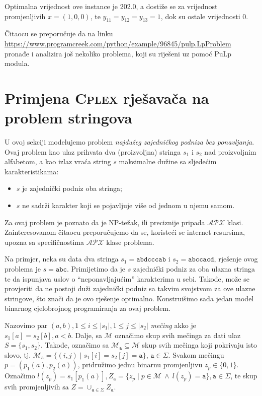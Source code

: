 \documentclass[a4paper, utf8, 11pt, colorlinks]{book}
\theoremstyle{definition}
\begin{document}
 Optimalna vrijednost ove instance je 202.0, a dostiže se za vrijednost promjenljivih $x = (1, 0, 0)$, te $y_{11}= y_{12}= y_{13} = 1$, dok su ostale vrijednosti 0.
 
Čitaocu se preporučuje da na linku \url{https://www.programcreek.com/python/example/96845/pulp.LpProblem}
pronađe i analizira još nekoliko problema, koji su riješeni uz pomoć PuLp modula. 
 
 \section{Primjena \textsc{Cplex} rješavača na problem stringova}
 
 U ovoj sekciji modelujemo problem \emph{najdužeg zajedničkog podniza bez ponavljanja}. Ovaj problem kao ulaz prihvata dva (proizvoljna) stringa $s_1$ i $s_2$ nad proizvoljnim alfabetom, a kao izlaz vraća string $s$ maksimalne dužine sa sljedećim karakteristikama:  
 \begin{itemize}
 	\item $s$ je zajednički podniz oba stringa; 
 	\item $s$ ne sadrži karakter koji se pojavljuje više od jednom u njemu samom.
 \end{itemize}
Za ovaj problem je poznato da je NP-težak, ili preciznije pripada $\mathcal{APX}$ klasi. Zainteresovanom čitaocu preporučujemo da se, koristeći se internet resursima, upozna sa specifičnostima $\mathcal{APX}$ klase problema.

Na primjer, neka su data dva stringa $s_1 = \texttt{abdcccab}$ i $s_2=\texttt{abccacd}$, rješenje ovog problema je $s=\texttt{abc}$. Primijetimo da je $s$ zajednički podniz za oba ulazna stringa te da ispunjava uslov o ``neponavljajućim'' karakterima u sebi. Takođe, može se provjeriti da ne postoji duži zajednički podniz sa takvim svojstvom za ove ulazne stringove, što znači da je ovo rješenje optimalno. Konstruišimo sada jedan model binarnog cjelobrojnog programiranja za ovaj problem. 

Nazovimo par $(a, b), 1 \leq i \leq |s_1|, 1 \leq j \leq |s_2|$ \emph{mečing} akko je $s_1[a]=s_2[b], a < b$. Dalje, sa $\mathcal{M}$ označimo skup svih mečinga za dati ulaz $S=\{s_1, s_2\}$. Takođe, označimo sa  $\mathcal{M}_{\texttt{a}} \subseteq \mathcal{M}$  skup svih mečinga koji pokrivaju isto slovo, tj. 
$\mathcal{M}_{\texttt{a}} = \{ (i, j) \mid s_1[i]=s_2[j]=\texttt{a}\}$, $\texttt{a} \in \Sigma$. Svakom mečingu $p=(p_1(a),p_2(a))$, pridružimo jednu binarnu promjenljivu $z_{p} \in \{0, 1\}$. Označimo $l(z_p)= s_1[ p_1(a) ], Z_{\texttt{a}} = \{ z_p \mid p \in \mathcal{M} \ \wedge\  l(z_p) = \texttt{a}\}, \texttt{a}\in \Sigma$, te skup svih promjenljivih sa $Z = \cup_{\texttt{a} \in \Sigma} Z_{\texttt{a}}$. 
\end{document}
